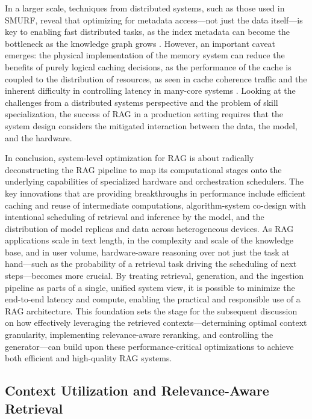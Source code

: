 \documentclass[11pt]{article}
\begin{document}
In a larger scale, techniques from distributed systems, such as those used in SMURF, reveal that optimizing for metadata access---not just the data itself---is key to enabling fast distributed tasks, as the index metadata can become the bottleneck as the knowledge graph grows \cite{ref63}. However, an important caveat emerges: the physical implementation of the memory system can reduce the benefits of purely logical caching decisions, as the performance of the cache is coupled to the distribution of resources, as seen in cache coherence traffic and the inherent difficulty in controlling latency in many-core systems \cite{ref63,ref64}. Looking at the challenges from a distributed systems perspective and the problem of skill specialization, the success of RAG in a production setting requires that the system design considers the mitigated interaction between the data, the model, and the hardware.

In conclusion, system-level optimization for RAG is about radically deconstructing the RAG pipeline to map its computational stages onto the underlying capabilities of specialized hardware and orchestration schedulers. The key innovations that are providing breakthroughs in performance include efficient caching and reuse of intermediate computations, algorithm-system co-design with intentional scheduling of retrieval and inference by the model, and the distribution of model replicas and data across heterogeneous devices. As RAG applications scale in text length, in the complexity and scale of the knowledge base, and in user volume, hardware-aware reasoning over not just the task at hand---such as the probability of a retrieval task driving the scheduling of next steps---becomes more crucial. By treating retrieval, generation, and the ingestion pipeline as parts of a single, unified system view, it is possible to minimize the end-to-end latency and compute, enabling the practical and responsible use of a RAG architecture. This foundation sets the stage for the subsequent discussion on how effectively leveraging the retrieved contexts---determining optimal context granularity, implementing relevance-aware reranking, and controlling the generator---can build upon these performance-critical optimizations to achieve both efficient and high-quality RAG systems.

\subsection{Context Utilization and Relevance-Aware Retrieval}
\end{document}

